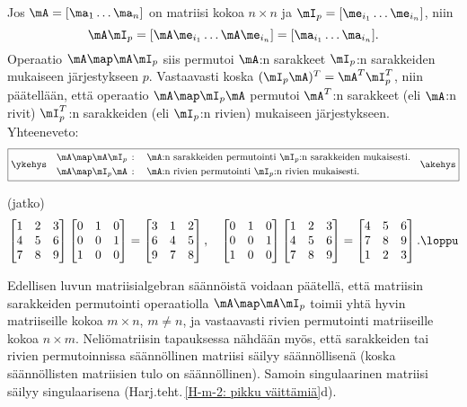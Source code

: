 Jos $\mA=[\ma_1 \ldots \ma_n]$ on matriisi kokoa $n \times n$ ja
$\mI_p=[\me_{i_1} \ldots \me_{i_n}]$, niin
\[
\mA\mI_p = [\mA\me_{i_1} \ldots \mA\me_{i_n}] = [\ma_{i_1} \ldots \ma_{i_n}].
\]
Operaatio $\mA \map \mA\mI_p$ siis permutoi $\mA$:n sarakkeet $\mI_p$:n sarakkeiden mukaiseen
järjestykseen $p$. Vastaavasti koska $(\mI_p\mA)^T = \mA^T\mI_p^T$, niin päätellään, että
operaatio $\mA \map \mI_p\mA$ permutoi $\mA^T$:n sarakkeet (eli $\mA$:n rivit) $\mI_p^T$:n
sarakkeiden (eli $\mI_p$:n rivien) mukaiseen järjestykseen. Yhteeneveto:
\[
\boxed{\ykehys \begin{aligned}
\quad&\mA\map\mA\mI_p\,: \quad \text{$\mA$:n sarakkeiden permutointi $\mI_p$:n 
                                             sarakkeiden mukaisesti}. \quad \\
     &\mA\map\mI_p\mA\,: \quad \text{$\mA$:n rivien permutointi $\mI_p$:n rivien mukaisesti}.
\end{aligned} \akehys}
\]
\jatko \begin{Exa} (jatko)
\[
\begin{bmatrix} 1&2&3\\4&5&6\\7&8&9 \end{bmatrix}
\begin{bmatrix} 0&1&0\\0&0&1\\1&0&0 \end{bmatrix} =
\begin{bmatrix} 3&1&2\\6&4&5\\9&7&8 \end{bmatrix}, \quad
\begin{bmatrix} 0&1&0\\0&0&1\\1&0&0 \end{bmatrix}
\begin{bmatrix} 1&2&3\\4&5&6\\7&8&9 \end{bmatrix} =
\begin{bmatrix} 4&5&6\\7&8&9\\1&2&3 \end{bmatrix}. \loppu
\]
\end{Exa}
Edellisen luvun matriisialgebran säännöistä voidaan päätellä, että matriisin sarakkeiden
permutointi operaatiolla $\mA\map\mA\mI_p$ toimii yhtä hyvin matriiseille kokoa $m \times n$,
$m \neq n$, ja vastaavasti rivien permutointi matriiseille kokoa $n \times m$. Neliömatriisin
tapauksessa nähdään myös, että sarakkeiden tai rivien permutoinnissa säännöllinen matriisi
säilyy säännöllisenä (koska säännöllisten matriisien tulo on säännöllinen). Samoin
singulaarinen matriisi säilyy singulaarisena (Harj.teht.\,\ref{H-m-2: pikku väittämiä}d).

